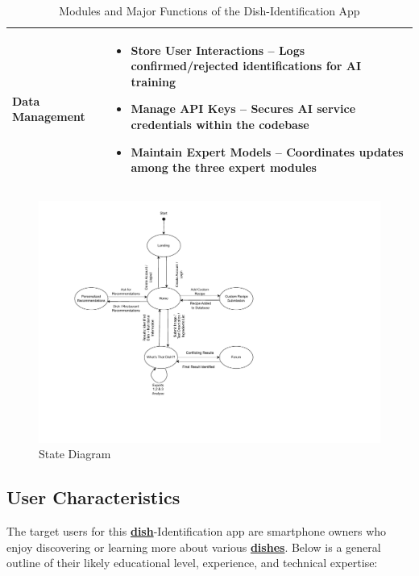 \documentclass[]{article}
\begin{document}
\begin{table}[H]
\begin{tabular}{|p{4cm}|p{10cm}|}
	\hline
	\textbf{Data Management} &
	\begin{itemize}
		\item \textbf{Store User Interactions} – Logs confirmed/rejected identifications for AI training
		\item \textbf{Manage API Keys} – Secures AI service credentials within the codebase
		\item \textbf{Maintain Expert Models} – Coordinates updates among the three expert modules
	\end{itemize} \\
	\hline
	\end{tabular}
	\caption{Modules and Major Functions of the Dish-Identification App}
	\label{tab:dish-functions}
\end{table}

\begin{figure}[H]
	\centering
	\includegraphics[width=\textwidth]{image/2.2_State-Diagram.pdf}
	\caption{State Diagram}
\end{figure}

\subsection{User Characteristics}
\label{sub:user_characteristics}

The target users for this \hyperref[Dish]{\textbf{dish}}-Identification app are smartphone owners who enjoy discovering or learning more about various \hyperref[Dish]{\textbf{dishes}}. Below is a general outline of their likely educational level, experience, and technical expertise:
\end{document}
